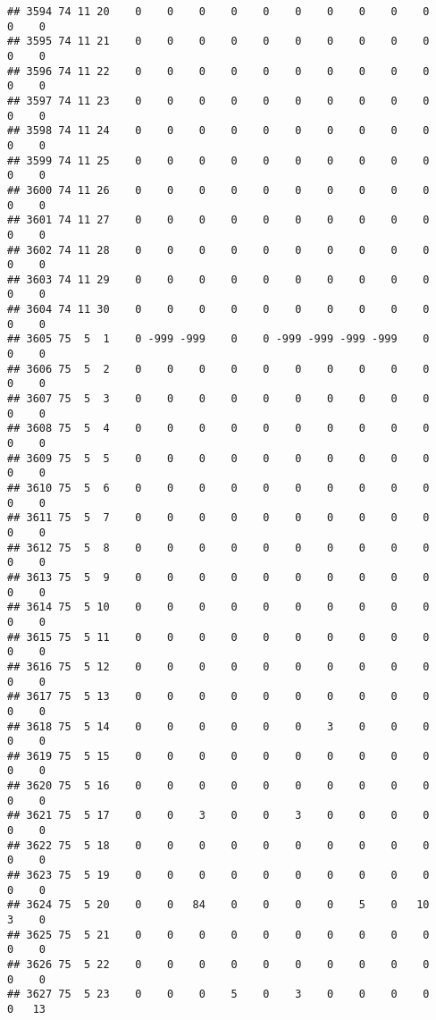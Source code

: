 \documentclass[]{article}
\begin{document}
\begin{verbatim}
## 3594 74 11 20    0    0    0    0    0    0    0    0    0    0    0    0
## 3595 74 11 21    0    0    0    0    0    0    0    0    0    0    0    0
## 3596 74 11 22    0    0    0    0    0    0    0    0    0    0    0    0
## 3597 74 11 23    0    0    0    0    0    0    0    0    0    0    0    0
## 3598 74 11 24    0    0    0    0    0    0    0    0    0    0    0    0
## 3599 74 11 25    0    0    0    0    0    0    0    0    0    0    0    0
## 3600 74 11 26    0    0    0    0    0    0    0    0    0    0    0    0
## 3601 74 11 27    0    0    0    0    0    0    0    0    0    0    0    0
## 3602 74 11 28    0    0    0    0    0    0    0    0    0    0    0    0
## 3603 74 11 29    0    0    0    0    0    0    0    0    0    0    0    0
## 3604 74 11 30    0    0    0    0    0    0    0    0    0    0    0    0
## 3605 75  5  1    0 -999 -999    0    0 -999 -999 -999 -999    0    0    0
## 3606 75  5  2    0    0    0    0    0    0    0    0    0    0    0    0
## 3607 75  5  3    0    0    0    0    0    0    0    0    0    0    0    0
## 3608 75  5  4    0    0    0    0    0    0    0    0    0    0    0    0
## 3609 75  5  5    0    0    0    0    0    0    0    0    0    0    0    0
## 3610 75  5  6    0    0    0    0    0    0    0    0    0    0    0    0
## 3611 75  5  7    0    0    0    0    0    0    0    0    0    0    0    0
## 3612 75  5  8    0    0    0    0    0    0    0    0    0    0    0    0
## 3613 75  5  9    0    0    0    0    0    0    0    0    0    0    0    0
## 3614 75  5 10    0    0    0    0    0    0    0    0    0    0    0    0
## 3615 75  5 11    0    0    0    0    0    0    0    0    0    0    0    0
## 3616 75  5 12    0    0    0    0    0    0    0    0    0    0    0    0
## 3617 75  5 13    0    0    0    0    0    0    0    0    0    0    0    0
## 3618 75  5 14    0    0    0    0    0    0    3    0    0    0    0    0
## 3619 75  5 15    0    0    0    0    0    0    0    0    0    0    0    0
## 3620 75  5 16    0    0    0    0    0    0    0    0    0    0    0    0
## 3621 75  5 17    0    0    3    0    0    3    0    0    0    0    0    0
## 3622 75  5 18    0    0    0    0    0    0    0    0    0    0    0    0
## 3623 75  5 19    0    0    0    0    0    0    0    0    0    0    0    0
## 3624 75  5 20    0    0   84    0    0    0    0    5    0   10    3    0
## 3625 75  5 21    0    0    0    0    0    0    0    0    0    0    0    0
## 3626 75  5 22    0    0    0    0    0    0    0    0    0    0    0    0
## 3627 75  5 23    0    0    0    5    0    3    0    0    0    0    0   13

\end{verbatim}
\end{document}
